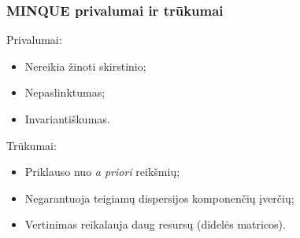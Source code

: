 \documentclass[utf8,hyperref={unicode,pdftex}]{beamer}
\begin{document}
\begin{frame}
\frametitle{MINQUE privalumai ir trūkumai}
Privalumai:
\begin{itemize}
\item Nereikia žinoti skirstinio;
\item Nepaslinktumas;
\item Invariantiškumas.
\end{itemize}
Trūkumai:
\begin{itemize}
\item Priklauso nuo \textit{a priori} reikšmių;
\item Negarantuoja teigiamų dispersijos komponenčių įverčių;
\item Vertinimas reikalauja daug resursų (didelės matricos).
\end{itemize}
\end{frame}
\end{document}
